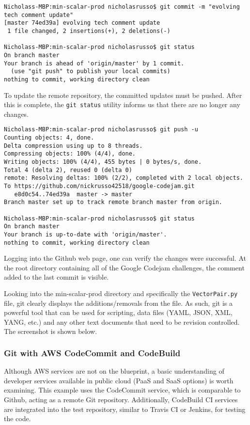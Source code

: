 \begin{verbatim}
Nicholass-MBP:min-scalar-prod nicholasrusso$ git commit -m "evolving tech comment update"
[master 74ed39a] evolving tech comment update
 1 file changed, 2 insertions(+), 2 deletions(-)

Nicholass-MBP:min-scalar-prod nicholasrusso$ git status
On branch master
Your branch is ahead of 'origin/master' by 1 commit.
  (use "git push" to publish your local commits)
nothing to commit, working directory clean
\end{verbatim}

To update the remote repository, the committed updates must be pushed. After
this is complete, the \verb|git status| utility informs us that there are no
longer any changes.

\begin{verbatim}
Nicholass-MBP:min-scalar-prod nicholasrusso$ git push -u
Counting objects: 4, done.
Delta compression using up to 8 threads.
Compressing objects: 100% (4/4), done.
Writing objects: 100% (4/4), 455 bytes | 0 bytes/s, done.
Total 4 (delta 2), reused 0 (delta 0)
remote: Resolving deltas: 100% (2/2), completed with 2 local objects.
To https://github.com/nickrusso42518/google-codejam.git
   e8d0c54..74ed39a  master -> master
Branch master set up to track remote branch master from origin.

Nicholass-MBP:min-scalar-prod nicholasrusso$ git status
On branch master
Your branch is up-to-date with 'origin/master'.
nothing to commit, working directory clean
\end{verbatim}

Logging into the Github web page, one can verify the changes were successful. At
the root directory containing all of the Google Codejam challenges, the
comment added to the last commit is visible.


Looking into the min-scalar-prod directory and specifically the \verb|VectorPair.py|
file, git clearly displays the additions/removals from the file. As such, git
is a powerful tool that can be used for scripting, data files (YAML, JSON,
XML, YANG, etc.) and any other text documents that need to be revision
controlled. The screenshot is shown below.


\subsubsection{Git with AWS CodeCommit and CodeBuild}
Although AWS services are not on the blueprint, a basic understanding of
developer services available in public cloud (PaaS and SaaS options) is worth
examining. This example uses the CodeCommit service, which is comparable to
Github, acting as a remote Git repository. Additionally, CodeBuild CI services
are integrated into the test repository, similar to Travis CI or Jenkins, for
testing the code.

